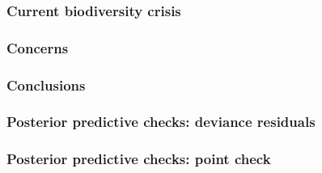 \documentclass{beamer}
\begin{document}
\begin{frame}
  \frametitle{Current biodiversity crisis}
\end{frame}

\begin{frame}
  \frametitle{Concerns}
\end{frame}

\begin{frame}
  \frametitle{Conclusions}
\end{frame}

\appendix

\begin{frame}
  \frametitle{Posterior predictive checks: deviance residuals}
\end{frame}

\begin{frame}
  \frametitle{Posterior predictive checks: point check}
\end{frame}
\end{document}
